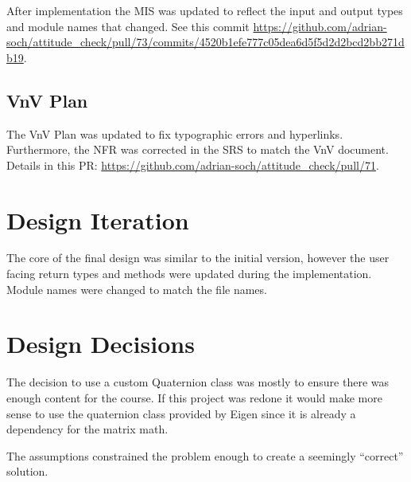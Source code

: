 \documentclass{article}
\begin{document}
After implementation the MIS was updated to reflect the input and output types and module names that
changed. See this commit
\url{https://github.com/adrian-soch/attitude_check/pull/73/commits/4520b1efe777c05dea6d5f5d2d2bcd2bb271db19}.

\subsection{VnV Plan}

The VnV Plan was updated to fix typographic errors and hyperlinks. Furthermore, the NFR was
corrected in the SRS to match the VnV document. Details in this PR:
\url{https://github.com/adrian-soch/attitude_check/pull/71}.

\section{Design Iteration}


The core of the final design was similar to the initial version, however the user facing return
types and methods were updated during the implementation. Module names were changed to match the
file names.

\section{Design Decisions}


The decision to use a custom Quaternion class was mostly to ensure there was enough content for the
course. If this project was redone it would make more sense to use the quaternion class provided by
Eigen since it is already a dependency for the matrix math.

The assumptions constrained the problem enough to create a seemingly ``correct'' solution.


\end{document}
